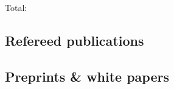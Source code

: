 \documentclass[letterpaper,12pt,preprint]{article}
\begin{document}
Total: 

\subsection*{Refereed publications}

\begin{list}{}{\cvlist}

\end{list}

\subsection*{Preprints \& white papers}

\begin{list}{}{\cvlist}

\end{list}
\end{document}
